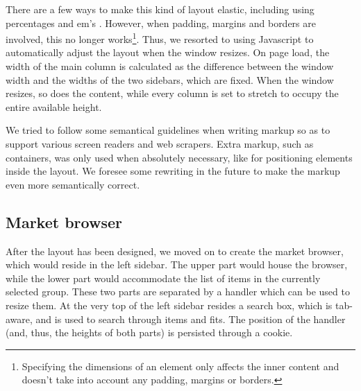 There are a few ways to make this kind of layout elastic, including using percentages and em’s \cite{em}. However, when padding, margins and borders are involved, this no longer works\footnote{Specifying the dimensions of an element only affects the inner content and doesn’t take into account any padding, margins or borders.}. Thus, we resorted to using Javascript to automatically adjust the layout when the window resizes. On page load, the width of the main column is calculated as the difference between the window width and the widths of the two sidebars, which are fixed. When the window resizes, so does the content, while every column is set to stretch to occupy the entire available height.

We tried to follow some semantical guidelines when writing markup so as to support various screen readers and web scrapers. Extra markup, such as containers, was only used when absolutely necessary, like for positioning elements inside the layout. We foresee some rewriting in the future to make the markup even more semantically correct.

\subsection{Market browser}
After the layout has been designed, we moved on to create the market browser, which would reside in the left sidebar. The upper part would house the browser, while the lower part would accommodate the list of items in the currently selected group. These two parts are separated by a handler which can be used to resize them. At the very top of the left sidebar resides a search box, which is tab-aware, and is used to search through items and fits. The position of the handler (and, thus, the heights of both parts) is persisted through a cookie.

